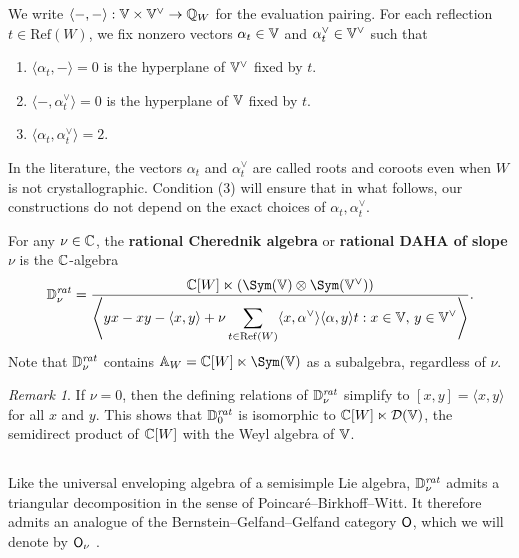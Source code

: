 \documentclass[a4paper,10pt,leqno]{amsart}
\theoremstyle{plain}
\theoremstyle{plain}
\theoremstyle{plain}
\theoremstyle{definition}
\theoremstyle{remark}
\newtheorem{rem}[thm]{Remark}
\newcommand{\dfemph}[1]{\textbf{#1}}
\newcommand{\rat}{\mathit{rat}}
\newcommand{\slope}{\nu}
\begin{document}
We write $\langle-, -\rangle : \bb{V} \times \bb{V}^\vee \to \bb{Q}_W$ for the evaluation pairing.
For each reflection $t \in \mathrm{Ref}(W)$, we fix nonzero vectors $\alpha_t \in \bb{V}$ and $\alpha_t^\vee \in \bb{V}^\vee$ such that 
\begin{enumerate}
\item 	$\langle\alpha_t, -\rangle = 0$ is the hyperplane of $\bb{V}^\vee$ fixed by $t$.
\item 	$\langle-, \alpha_t^\vee\rangle = 0$ is the hyperplane of $\bb{V}$ fixed by $t$.
\item 	$\langle\alpha_t, \alpha_t^\vee\rangle = 2$.
\end{enumerate}
In the literature, the vectors $\alpha_t$ and $\alpha_t^\vee$ are called roots and coroots even when $W$ is not crystallographic.
Condition (3) will ensure that in what follows, our constructions do not depend on the exact choices of $\alpha_t, \alpha_t^\vee$.

For any $\slope \in \bb{C}$, the \dfemph{rational Cherednik algebra} or \dfemph{rational DAHA of slope $\slope$} is the $\bb{C}$-algebra
\begin{align}
\bb{D}_\slope^\rat
=	\frac{\bb{C}[W] \ltimes (\Sym(\bb{V}) \otimes \Sym(\bb{V}^\vee))}{\left\langle 
yx - xy - \langle x, y\rangle + \slope \displaystyle\sum_{t \in \mathrm{Ref}(W)} \langle x, \alpha^\vee\rangle\langle\alpha, y\rangle t
: x \in \bb{V},\,y \in \bb{V}^\vee
\right\rangle}.
\end{align}
Note that $\bb{D}_\slope^\rat$ contains $\bb{A}_W = \bb{C}[W] \ltimes \Sym(\bb{V})$ as a subalgebra, regardless of $\slope$.

\begin{rem}
If $\slope = 0$, then the defining relations of $\bb{D}_\slope^\rat$ simplify to $[x, y] = \langle x, y\rangle$ for all $x$ and $y$.
This shows that $\bb{D}_0^\rat$ is isomorphic to $\bb{C}[W] \ltimes \cal{D}(\bb{V})$, the semidirect product of $\bb{C}[W]$ with the Weyl algebra of $\bb{V}$.
\end{rem}

\subsection{}

Like the universal enveloping algebra of a semisimple Lie algebra, $\bb{D}_\slope^\rat$ admits a triangular decomposition in the sense of Poincar\'e--Birkhoff--Witt.
It therefore admits an analogue of the Bernstein--Gelfand--Gelfand category $\sf{O}$, which we will denote by $\sf{O}_\slope$ \cite{ggor}.
\end{document}
